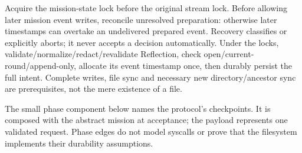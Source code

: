 \documentclass[a4paper,10pt,fleqn]{article}
\begin{document}
Acquire the mission-state lock before the original stream lock. Before
allowing later mission event writes, reconcile unresolved preparation:
otherwise later timestamps can overtake an undelivered prepared event.
Recovery classifies or explicitly aborts; it never accepts a decision
automatically. Under the locks, validate/normalize/redact/revalidate
Reflection, check open/current-round/append-only, allocate its event
timestamp once, then durably persist the full intent. Complete writes,
file sync and necessary new directory/ancestor sync are prerequisites,
not the mere existence of a file.

The small phase component below names the protocol's checkpoints. It
is composed with the abstract mission at acceptance; the payload
represents one validated request. Phase edges do not model syscalls or
prove that the filesystem implements their durability assumptions.
\end{document}
